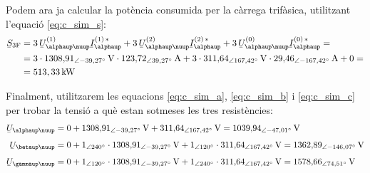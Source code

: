 \begin{exemple}
Podem ara ja calcular la pot\`{e}ncia consumida per la c\`{a}rrega
trif\`{a}sica, utilitzant l'equaci\'{o} \eqref{eq:c_sim_s}:
\[
\begin{split}
\cmplx{S}\ped{3F} &=  3\, \cmplx{U}_{\alphaup\nuup}^{(1)}
\cmplx{I}_\alphaup^{(1)\,*} + 3\, \cmplx{U}_{\alphaup\nuup}^{(2)}
\cmplx{I}_\alphaup^{(2)\,*} +  3\,
\cmplx{U}_{\alphaup\nuup}^{(0)}  \cmplx{I}_\alphaup^{(0)\,*} = \\
&= 3 \cdot 1308{,}91_{\angle -39{,}27\degree}\unit{V} \cdot
123{,}72_{\angle 39{,}27\degree}\unit{A} + 3 \cdot
311{,}64_{\angle
167{,}42\degree}\unit{V} \cdot 29{,}46_{\angle -167{,}42\degree}\unit{A} + 0 = \\
&= 513{,33}\unit{kW}
\end{split}
\]

Finalment, utilitzarem les equacions \eqref{eq:c_sim_a},
\eqref{eq:c_sim_b} i \eqref{eq:c_sim_c} per trobar la tensi\'{o} a qu\`{e}
estan sotmeses les tres resist\`{e}ncies:
\begin{align*}
    \cmplx{U}_{\alphaup\nuup} &= 0 + 1308{,}91_{\angle -39{,}27\degree}\unit{V} +
    311{,}64_{\angle 167{,}42\degree}\unit{V}  =
    1039{,}94_{\angle -47{,}01\degree}\unit{V} \\[1ex]
    \cmplx{U}_{\betaup\nuup} &= 0 + 1_{\angle 240\degree} \cdot
    1308{,}91_{\angle -39{,}27\degree}\unit{V} +
    1_{\angle 120\degree} \cdot
    311{,}64_{\angle 167{,}42\degree}\unit{V}  =
    1362{,}89_{\angle -146{,}07\degree}\unit{V}    \\[1ex]
    \cmplx{U}_{\gammaup\nuup} &= 0 + 1_{\angle 120\degree} \cdot
    1308{,}91_{\angle -39{,}27\degree}\unit{V} +
    1_{\angle 240\degree} \cdot 311{,}64_{\angle 167{,}42\degree}\unit{V}  =
    1578{,}66_{\angle 74{,}51\degree}\unit{V}
\end{align*}
\end{exemple}
